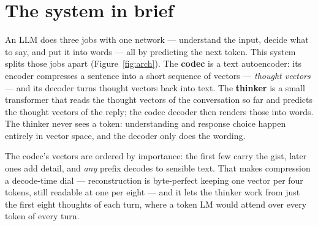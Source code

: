 \documentclass[11pt]{article}
\begin{document}
\section{The system in brief}
\label{sec:system}

An LLM does three jobs with one network --- understand the input, decide
what to say, and put it into words --- all by predicting the next token.
This system splits those jobs apart (Figure~\ref{fig:arch}). The
\textbf{codec} is a text autoencoder: its encoder compresses a sentence into
a short sequence of vectors --- \emph{thought vectors} --- and its decoder
turns thought vectors back into text. The \textbf{thinker} is a small
transformer that reads the thought vectors of the conversation so far and
predicts the thought vectors of the reply; the codec decoder then renders
those into words. The thinker never sees a token: understanding and
response choice happen entirely in vector space, and the decoder only does
the wording.

The codec's vectors are ordered by importance: the first few carry the
gist, later ones add detail, and \emph{any} prefix decodes to sensible
text. That makes compression a decode-time dial --- reconstruction is
byte-perfect keeping one vector per four tokens, still readable at one per
eight --- and it lets the thinker work from just the first eight thoughts
of each turn, where a token LM would attend over every token of every
turn.
\end{document}
